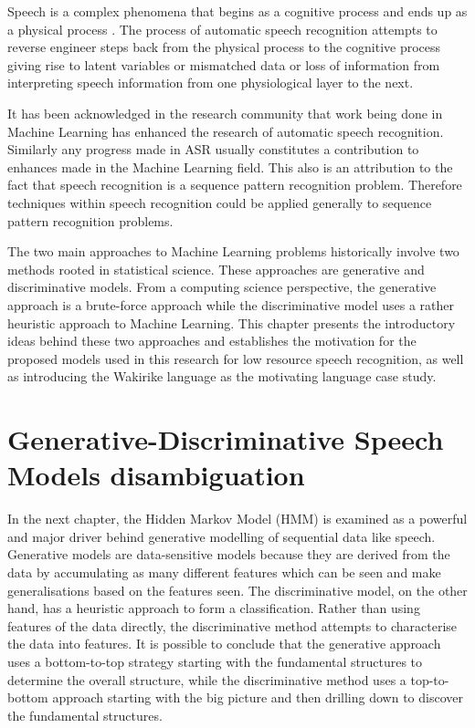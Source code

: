 Speech is a complex phenomena that begins as a cognitive process and ends up as a physical process \citep{becchetti1998}.  The process of automatic speech recognition attempts to reverse engineer steps back from the physical process to the cognitive process giving rise to latent variables or mismatched data or loss of information from interpreting speech information from one physiological layer to the next.

It has been acknowledged in the research community \citep{2015watanabe,deng2013machine}  that work being done in Machine Learning has enhanced the research of automatic speech recognition.  Similarly any progress made in ASR usually constitutes a contribution to enhances made in the Machine Learning field.  This also is an attribution to the fact that speech recognition is a sequence pattern recognition problem.  Therefore techniques within speech recognition could be applied generally to sequence pattern recognition problems.

The two main approaches to Machine Learning problems historically involve two methods rooted in statistical science.  These approaches are generative and discriminative models.  From a computing science perspective, the generative approach is a brute-force approach while the discriminative model uses a rather heuristic approach to Machine Learning. This chapter presents the introductory ideas behind these two approaches and establishes the motivation for the proposed models used in this research for low resource speech recognition, as well as introducing the Wakirike language as the motivating language case study.

\section{Generative-Discriminative Speech Models disambiguation}
\pagestyle{fancy}
In the next chapter, the Hidden Markov Model (HMM) is examined as a powerful and major driver behind generative modelling of sequential data like speech.  Generative models are data-sensitive models because they are derived from the data by accumulating as many different features which can be seen and make generalisations based on the features seen. The discriminative model, on the other hand, has a heuristic approach to form a classification.  Rather than using features of the data directly, the discriminative method attempts to characterise the data into features. It is possible to conclude that the generative approach uses a bottom-to-top strategy starting with the fundamental structures to determine the overall structure, while the discriminative method uses a top-to-bottom approach starting with the big picture and then drilling down to discover the fundamental structures.

